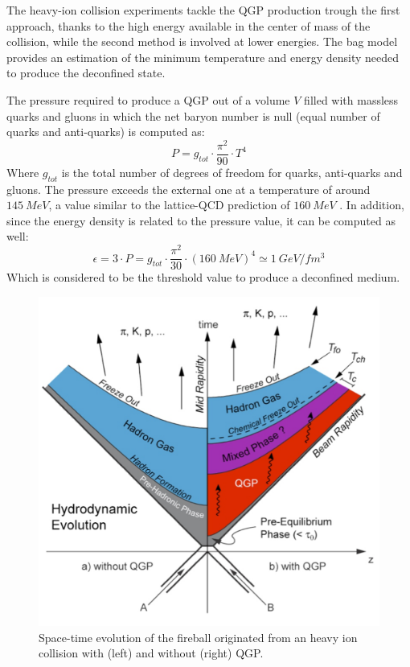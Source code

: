 The heavy-ion collision experiments tackle the QGP production  trough the first approach, thanks to the high energy available in the center of mass of the collision, while the second method is involved at lower energies.
The bag model provides an estimation of the minimum temperature and energy density needed to produce the deconfined state.

The pressure required to produce a QGP out of a volume $V$ filled with massless quarks and gluons in which the net baryon number is null (equal number of quarks and anti-quarks) is computed as:
\begin{equation}
P = g_{tot}\cdot\frac{\pi^2}{90}\cdot T^4
\end{equation}
Where $g_{tot}$ is the total number of degrees of freedom for quarks, anti-quarks and gluons.
The pressure exceeds the external one at a temperature of around $145\ MeV$, a value similar to the lattice-QCD prediction of $160\ MeV$ \cite{Kapoyannis:2017hcz}.
In addition, since the energy density is related to the pressure value, it can be computed as well:
\begin{equation}
\epsilon = 3\cdot P = g_{tot}\cdot\frac{\pi^2}{30}\cdot (160\ MeV)^4 \simeq 1\ GeV/fm^3
\end{equation}
Which is considered to be the threshold value to produce a deconfined medium.

\begin{figure}[!t]
\begin{center}
\includegraphics[width=0.85\linewidth]{Chapters/Introduction/Figs/QGP_evo.pdf}
\caption{Space-time evolution of the fireball originated from an heavy ion collision with (left) and without (right) QGP.}
\label{fig:evolution}
\end{center}
\end{figure}

